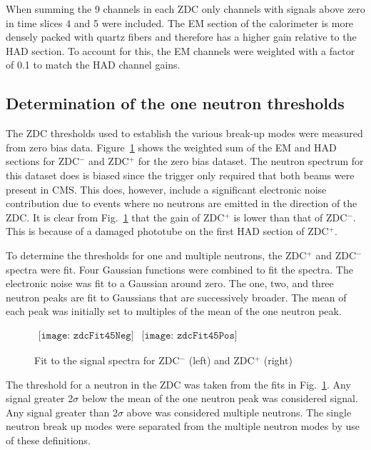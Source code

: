       When summing the 9 channels in each ZDC only channels with signals above 
        zero in time slices 4 and 5 were included. 
      The EM section of the calorimeter is more densely packed with quartz 
        fibers and therefore has a higher gain relative to the HAD section. 
      To account for this, the EM channels were weighted with
        a factor of 0.1 to match the HAD channel gains.

    \subsection{Determination of the one neutron thresholds}
      The ZDC thresholds used to establish the various break-up modes were 
        measured from zero bias data.
      Figure~\ref{fig:zdcM2Fit} shows the weighted sum of the EM and 
        HAD sections for  ZDC$^{-}$ and  ZDC$^{+}$ for the zero bias 
        dataset.
      The neutron spectrum for this dataset does is biased since the 
        trigger only required that both beams were present in CMS. 
      This does, however, include a significant electronic noise contribution due
        to events where no neutrons are emitted in the direction of the ZDC.
      It is clear from Fig.~\ref{fig:zdcM2Fit} that the gain of  
        ZDC$^{+}$ is lower than that of ZDC$^{-}$. 
      This is because of a damaged phototube on the first HAD section 
        of ZDC$^{+}$.

      To determine the thresholds for one and multiple neutrons, the ZDC$^{+}$ 
        and ZDC$^{-}$ spectra were fit.
      Four Gaussian functions were combined to fit the spectra. 
      The electronic noise was fit to a Gaussian around zero.
      The one, two, and three neutron peaks are fit to Gaussians that are 
        successively broader.
      The mean of each peak was initially set to multiples of the mean of the 
        one neutron peak. 
      \begin{figure}[!Hh]
        \centering
        $ 
          \begin{array}{cc}
            \texttt{[image: zdcFit45Neg]} &
            \texttt{[image: zdcFit45Pos]}
          \end{array} 
        $
        \caption{Fit to the signal spectra for ZDC$^{-}$ (left) and ZDC$^{+}$ 
          (right)}
        \label{fig:zdcM2Fit}
      \end{figure}
      The threshold for a neutron in the ZDC was taken from the fits in 
        Fig.~\ref{fig:zdcM2Fit}.
      Any signal greater 2$\sigma$ below the mean of the one neutron peak was 
        considered signal.
      Any signal greater than 2$\sigma$ above was considered multiple 
        neutrons.
      The single neutron break up modes were separated from the multiple 
        neutron modes by use of these definitions.

